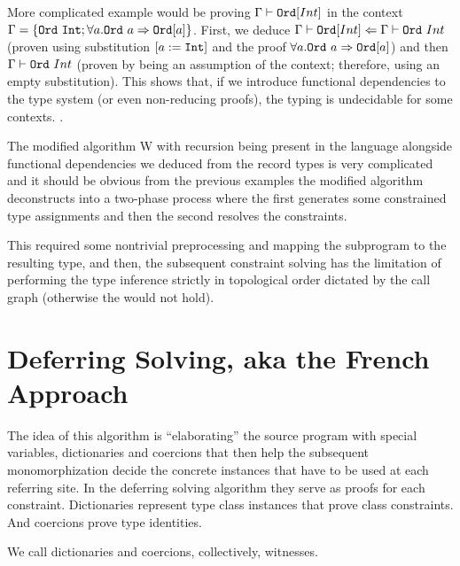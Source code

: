 \begin{ex}
    More complicated example would be proving $\Gamma \vdash \mathtt{Ord} [Int]$ in the context $\Gamma = \{\mathtt{Ord}\ \mathtt{Int}; \forall a . \mathtt{Ord}\ a \Rightarrow \mathtt{Ord} [a]\}$. First, we deduce $\Gamma \vdash \mathtt{Ord} [Int] \Leftarrow \Gamma \vdash \mathtt{Ord}\ Int$ (proven using substitution $[a := \mathtt{Int}]$ and the proof $\forall a . \mathtt{Ord}\ a \Rightarrow \mathtt{Ord} [a]$) and then $\Gamma \vdash \mathtt{Ord}\ Int$ (proven by being an assumption of the context; therefore, using an empty substitution). This shows that, if we introduce functional dependencies to the type system (or even non-reducing proofs), the typing is undecidable for some contexts. .
\end{ex}


The modified algorithm W with recursion being present in the language alongside functional dependencies we deduced from the record types is very complicated and it should be obvious from the previous examples the modified algorithm deconstructs into a two-phase process where the first generates some constrained type assignments and then the second resolves the constraints.

This required some nontrivial preprocessing and mapping the subprogram to the resulting type, and then, the subsequent constraint solving has the limitation of performing the type inference strictly in topological order dictated by the call graph (otherwise the  would not hold).

\section{Deferring Solving, aka the French Approach}
\label{defer_solve}

The idea of this algorithm is ``elaborating'' the source program with special variables, dictionaries and coercions that then help the subsequent monomorphization decide the concrete instances that have to be used at each referring site. In the deferring solving algorithm they serve as proofs for each constraint. Dictionaries represent type class instances that prove class constraints. And coercions prove type identities.

We call dictionaries and coercions, collectively, witnesses.

